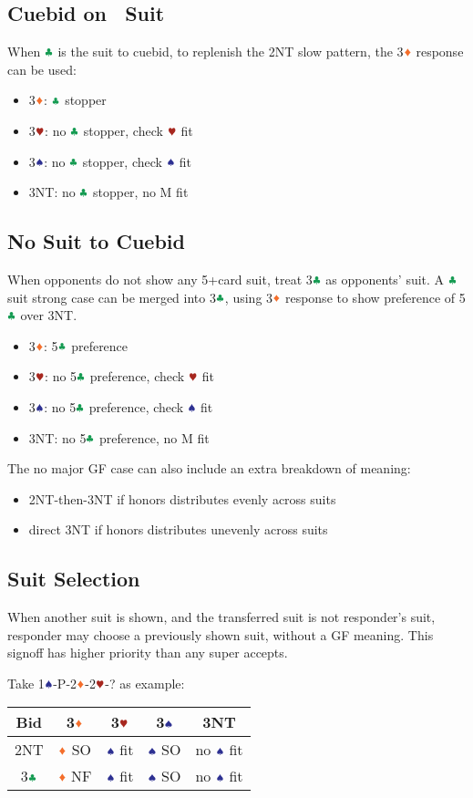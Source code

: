 \documentclass{article}
\begin{document}
\begin{multicols}{2}
\subsection{Cuebid on \CCC\ Suit}
When $\ccc$ is the suit to cuebid, to replenish the 2NT slow pattern, the 3$\ddd$ response can be used:
\begin{itemize}
    \item 3$\ddd$: $\ccc$ stopper
    \item 3$\hhh$: no $\ccc$ stopper, check $\hhh$ fit
    \item 3$\sss$: no $\ccc$ stopper, check $\sss$ fit
    \item 3NT: no $\ccc$ stopper, no M fit
\end{itemize}

\subsection{No Suit to Cuebid}
When opponents do not show any 5+card suit, treat 3$\ccc$ as opponents' suit. A $\ccc$ suit strong case can be merged into 3$\ccc$, using 3$\ddd$ response to show preference of 5$\ccc$ over 3NT.
\begin{itemize}
    \item 3$\ddd$: 5$\ccc$ preference
    \item 3$\hhh$: no 5$\ccc$ preference, check $\hhh$ fit
    \item 3$\sss$: no 5$\ccc$ preference, check $\sss$ fit
    \item 3NT: no 5$\ccc$ preference, no M fit
\end{itemize}

\noindent The no major GF case can also include an extra breakdown of meaning:
\begin{itemize}
    \item 2NT-then-3NT if honors distributes evenly across suits
    \item direct 3NT if honors distributes unevenly across suits
\end{itemize}

\subsection{Suit Selection}
When another suit is shown, and the transferred suit is not responder's suit, responder may choose a previously shown suit, without a GF meaning. This signoff has higher priority than any super accepts.

\noindent Take 1$\sss$-P-2$\ddd$-2$\hhh$-? as example: \\
\begin{tabular}{c|c|c|c|c}
    \hline
    Bid & 3$\ddd$ & 3$\hhh$ & 3$\sss$ & 3NT \\ \hline\hline
    2NT & $\ddd$ SO & $\sss$ fit & $\sss$ SO & no $\sss$ fit \\ \hline
    3$\ccc$ & $\ddd$ NF & $\sss$ fit & $\sss$ SO & no $\sss$ fit \\ \hline
\end{tabular}


\end{multicols}
\end{document}

